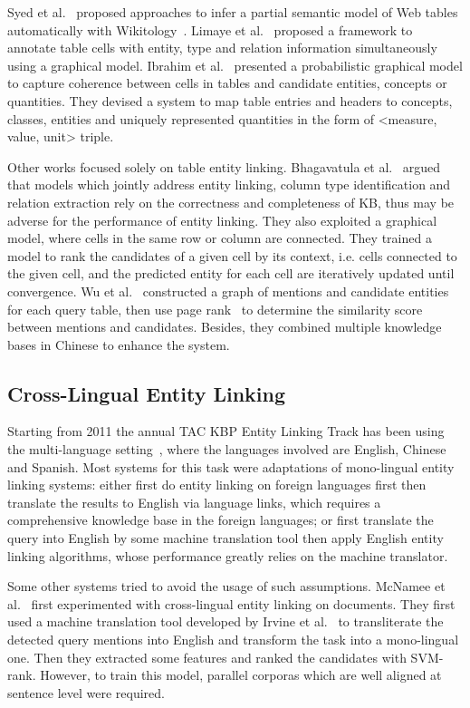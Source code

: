 Syed et al.~\cite{syed2010exploiting} proposed approaches to infer a partial semantic model of Web tables automatically with Wikitology~\cite{syed2008wikitology}. Limaye et al.~\cite{limaye2010annotating} proposed a framework to annotate table cells with entity, type and relation information simultaneously using a graphical model. Ibrahim et al.~\cite{ibrahim2016making} presented a probabilistic graphical model to capture coherence between cells in tables and candidate entities, concepts or quantities. They devised a system to map table entries and headers to concepts, classes, entities and uniquely represented quantities in the form of <measure, value, unit> triple.

Other works focused solely on table entity linking.
Bhagavatula et al.~\cite{bhagavatula2015tabel} argued that models which jointly address entity linking, column type identification and relation extraction rely on the correctness and completeness of KB, thus may be adverse for the performance of entity linking. They also exploited a graphical model, where cells in the same row or column are connected. They trained a model to rank the candidates of a given cell by its context, i.e. cells connected to the given cell, and the predicted entity for each cell are iteratively updated until convergence. Wu et al.~\cite{wu2016entity} constructed a graph of mentions and candidate entities for each query table, then use page rank~\cite{page1999pagerank} to determine the similarity score between mentions and candidates. Besides, they combined multiple knowledge bases in Chinese to enhance the system.


\subsection{Cross-Lingual Entity Linking}
\label{sec:cl}
Starting from 2011 the annual TAC KBP Entity Linking Track has been using the multi-language setting~\cite{ji2010overview, ji2014overview, ji2015overview}, where the languages involved are English, Chinese and Spanish. Most systems for this task were adaptations of mono-lingual entity linking systems: either first do entity linking on foreign languages first then translate the results to English via language links, which requires a comprehensive knowledge base in the foreign languages; or first translate the query into English by some machine translation tool then apply English entity linking algorithms, whose performance greatly relies on the machine translator. 

Some other systems tried to avoid the usage of such assumptions. McNamee et al.~\cite{mcnamee2011cross} first experimented with cross-lingual entity linking on documents. They first used a machine translation tool developed by Irvine et al.~\cite{irvine2010transliterating} to transliterate the detected query mentions into English and transform the task into a mono-lingual one. Then they extracted some features and ranked the candidates with SVM-rank. However, to train this model, parallel corporas which are well aligned at sentence level were required.

